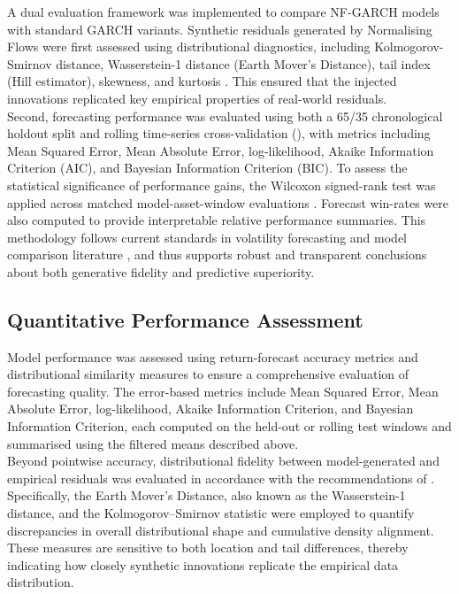 \documentclass[oneside,12pt]{CUEDthesisPSnPDF}
\newcommand{\textcite}{\citet}
\newcommand{\parencite}{\citep}
\begin{document}
A dual evaluation framework was implemented to compare NF-GARCH models with standard GARCH variants. Synthetic residuals generated by Normalising Flows were first assessed using distributional diagnostics, including Kolmogorov-Smirnov distance, Wasserstein-1 distance (Earth Mover's Distance), tail index (Hill estimator), skewness, and kurtosis \parencite{theis2015note, xu2019modeling}. This ensured that the injected innovations replicated key empirical properties of real-world residuals.\\

Second, forecasting performance was evaluated using both a 65/35 chronological holdout split and rolling time-series cross-validation (\parencite{bergmeir2012use}), with metrics including Mean Squared Error, Mean Absolute Error, log-likelihood, Akaike Information Criterion (AIC), and Bayesian Information Criterion (BIC). To assess the statistical significance of performance gains, the Wilcoxon signed-rank test was applied across matched model-asset-window evaluations \parencite{demvsar2006statistical}. Forecast win-rates were also computed to provide interpretable relative performance summaries. This methodology follows current standards in volatility forecasting and model comparison literature \parencite{amisano2007comparing, ziel2016forecasting}, and thus supports robust and transparent conclusions about both generative fidelity and predictive superiority.\\


\subsection{Quantitative Performance Assessment}

\noindent
Model performance was assessed using return-forecast accuracy metrics and distributional similarity measures to ensure a comprehensive evaluation of forecasting quality. The error-based metrics include Mean Squared Error, Mean Absolute Error, log-likelihood, Akaike Information Criterion, and Bayesian Information Criterion, each computed on the held-out or rolling test windows and summarised using the filtered means described above.\\

\medskip
\noindent
Beyond pointwise accuracy, distributional fidelity between model-generated and empirical residuals was evaluated in accordance with the recommendations of  \textcite{ericson2024deep}. Specifically, the Earth Mover’s Distance, also known as the Wasserstein-1 distance, and the Kolmogorov–Smirnov statistic were employed to quantify discrepancies in overall distributional shape and cumulative density alignment. These measures are sensitive to both location and tail differences, thereby indicating how closely synthetic innovations replicate the empirical data distribution.\\
\end{document}
